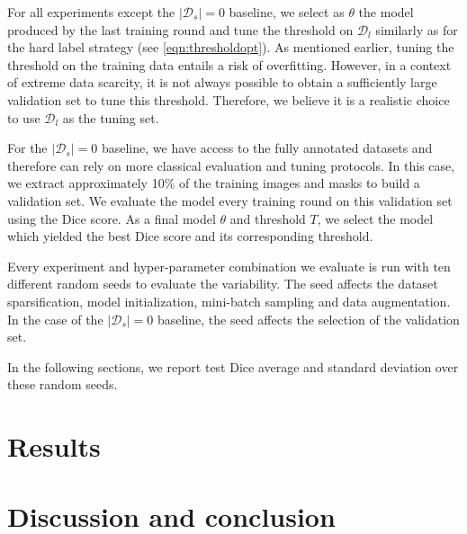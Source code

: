 For all experiments except the $|\mathcal{D}_s| = 0$ baseline, we select as $\theta$ the model produced by the last training round and tune the threshold on $\mathcal{D}_l$ similarly as for the hard label strategy (see \cref{eqn:thresholdopt}). As mentioned earlier, tuning the threshold on the training data entails a risk of overfitting. However, in a context of extreme data scarcity, it is not always possible to obtain a sufficiently large validation set to tune this threshold. Therefore, we believe it is a realistic choice to use $\mathcal{D}_l$ as the tuning set.  

For the $|\mathcal{D}_s| = 0$ baseline, we have access to the fully annotated datasets and therefore can rely on more classical evaluation and tuning protocols. In this case, we extract approximately 10\% of the training images and masks to build a validation set. We evaluate the model every training round on this validation set using the Dice score. As a final model $\theta$ and threshold $T$, we select the model which yielded the best Dice score and its corresponding threshold. 

Every experiment and hyper-parameter combination we evaluate is run with ten different random seeds to evaluate the variability. The seed affects the dataset sparsification, model initialization, mini-batch sampling and data augmentation. In the case of the $|\mathcal{D}_s| = 0$ baseline, the seed affects the selection of the validation set. 

In the following sections, we report test Dice average and standard deviation over these random seeds.  




\section{Results}
\label{sec:results}


\section{Discussion and conclusion}

\parencite{haridas2015interactive, petit2018handling, petit2021iterative}